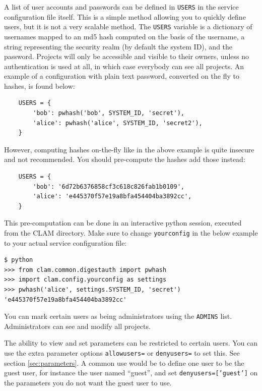 \documentclass[a4paper,12pt]{report}
\begin{document}
A list of user accounts and passwords can be defined in \texttt{USERS} in the
service configuration file itself. This is a simple method allowing you to
quickly define users, but it is not a very scalable method. The \texttt{USERS}
variable is a dictionary of usernames mapped to an md5 hash computed on the
basis of the username, a string representing the security realm (by default the
system ID), and the password. Projects will only be accessible and visible to
their owners, unless no authentication is used at all, in which case everybody
can see all projects. An example of a configuration with plain text password,
converted on the fly to hashes, is found below:

\begin{verbatim}
    USERS = {
        'bob': pwhash('bob', SYSTEM_ID, 'secret'), 
		'alice': pwhash('alice', SYSTEM_ID, 'secret2'),
    }
\end{verbatim}

However, computing hashes on-the-fly like in the above example is quite
insecure and not recommended. You should pre-compute the hashes add those
instead:

\begin{verbatim}
    USERS = {
        'bob': '6d72b6376858cf3c618c826fab1b0109',
		'alice': 'e445370f57e19a8bfa454404ba3892cc',
    }
\end{verbatim}

This pre-computation can be done in an interactive python session, executed from
the CLAM directory. Make sure to change \texttt{yourconfig} in the below
example to your actual service configuration file:

\begin{verbatim}
$ python
>>> from clam.common.digestauth import pwhash
>>> import clam.config.yourconfig as settings
>>> pwhash('alice', settings.SYSTEM_ID, 'secret')
'e445370f57e19a8bfa454404ba3892cc'
\end{verbatim}

You can mark certain users as being administrators using the \texttt{ADMINS}
list. Administrators can see and modify all projects.


The ability to view and set parameters can be restricted to certain users. You
can use the extra parameter options \texttt{allowusers=} or \texttt{denyusers=}
to set this. See section \ref{sec:parameters}. A common use would be to define
one user to be the guest user, for instance the user named ``guest'', and set
\texttt{denyusers=['guest']} on the parameters you do not want the guest user
to use.
\end{document}
